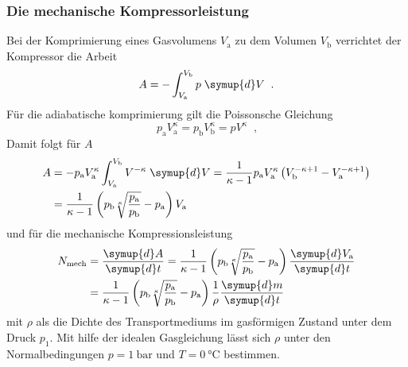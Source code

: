 \subsubsection{Die mechanische Kompressorleistung}
Bei der Komprimierung eines Gasvolumens $V_\text{a}$ zu dem Volumen $V_\text{b}$ 
verrichtet der Kompressor die Arbeit
\begin{equation}
    A = - \int^{V_\text{b}}_{V_\text{a}} p \; \symup{d}V \; \; \text{.}
\end{equation}
Für die adiabatische komprimierung gilt die Poissonsche Gleichung
\begin{equation}
    p_\text{a} V^\kappa_\text{a} = p_\text{b} V^\kappa_\text{b} = p V^\kappa \; \;
    \text{,}
\end{equation}
Damit folgt für $A$
\begin{equation}
    \begin{split}
        A &= - p_\text{a} V^\kappa_\text{a} \int^{V_\text{b}}_{V_\text{a}} V^{-\kappa}
        \; \symup{d}V = \frac{1}{\kappa - 1} p_\text{a} V^\kappa_\text{a} \left(
        V^{-\kappa + 1}_\text{b} - V^{-\kappa + 1}_\text{a} \right) \\
        &= \frac{1}{\kappa - 1} \left(p_\text{b} \sqrt[\kappa]{
        \frac{p_\text{a}}{p_\text{b}}} - p_\text{a}\right) V_\text{a}
    \end{split}
\end{equation}
und für die mechanische Kompressionsleistung
\begin{equation}
    \begin{split}
        N_\text{mech} &= \frac{\symup{d}A}{\symup{d}t} = \frac{1}{\kappa - 1}
        \left(p_\text{b} \sqrt[\kappa]{ \frac{p_\text{a}}{p_\text{b}}} 
        - p_\text{a} \right) \frac{\symup{d}V_\text{a}}{\symup{d}t} \\
        &= \frac{1}{\kappa - 1} \left(p_\text{b} \sqrt[\kappa]{ 
        \frac{p_\text{a}}{p_\text{b}}} - p_\text{a}\right) \frac{1}{\rho}
        \frac{\symup{d}m}{\symup{d}t}
        \label{eqn:Kompressor}
    \end{split}
\end{equation}
mit $\rho$ als die Dichte des Transportmediums im gasförmigen Zustand unter dem Druck $p_1$.
Mit hilfe der idealen Gasgleichung lässt sich $\rho$ unter den Normalbedingungen 
$p = \SI{1}{\bar}$ und $T = \SI{0}{\celsius}$ bestimmen.